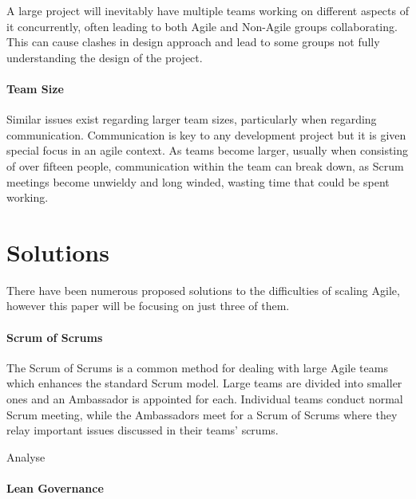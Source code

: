 \documentclass{scrartcl}
\begin{document}
A large project will inevitably have multiple teams working on different aspects of it concurrently, often leading to both Agile and Non-Agile groups collaborating. This can cause clashes in design approach and lead to some groups not fully understanding the design of the project. 

 

\paragraph{Team Size}\mbox{}\newline

Similar issues exist regarding larger team sizes, particularly when regarding communication. Communication is key to any development project but it is given special focus in an agile context. \cite{stoica2013software} As teams become larger, usually when consisting of over fifteen people, \cite{ambler2009agile} communication within the team can break down, as Scrum meetings become unwieldy and long winded, wasting time that could be spent working.

\section{Solutions}

There have been numerous proposed solutions to the difficulties of scaling Agile, however this paper will be focusing on just three of them. 

\paragraph{Scrum of Scrums}\mbox{}\newline

The Scrum of Scrums is a common method for dealing with large Agile teams which enhances the standard Scrum model. Large teams are divided into smaller ones and an Ambassador is appointed for each. Individual teams conduct normal Scrum meeting, while the Ambassadors meet for a Scrum of Scrums where they relay important issues discussed in their teams' scrums.

Analyse

\paragraph{Lean Governance}\mbox{}\newline
\end{document}
